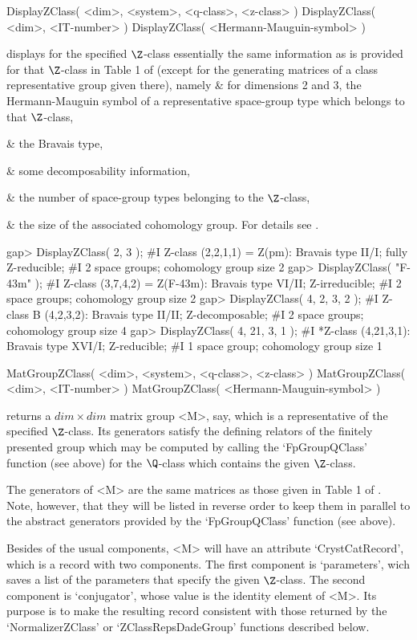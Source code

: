 \>DisplayZClass( <dim>, <system>, <q-class>, <z-class> )
\>DisplayZClass( <dim>, <IT-number> )
\>DisplayZClass( <Hermann-Mauguin-symbol> )

displays for the specified $\Z$-class essentially the same information
as is provided for that $\Z$-class in Table 1 of \cite{BBNWZ78}
(except for the generating matrices of a class representative group
given there), namely
\beginitems
& \itm for  dimensions 2 and 3, the  Hermann-Mauguin symbol of a
       representative space-group type  which belongs  to that $\Z$-class,

& \itm the Bravais type,

& \itm some decomposability information,

& \itm the number of space-group types belonging to the $\Z$-class,

& \itm the size of the associated cohomology group.
\enditems
For details see \cite{BBNWZ78}.

\beginexample
gap> DisplayZClass( 2, 3 );
#I    Z-class (2,2,1,1) = Z(pm): Bravais type II/I; fully Z-reducible;
#I     2 space groups; cohomology group size 2
gap> DisplayZClass( "F-43m" );
#I    Z-class (3,7,4,2) = Z(F-43m): Bravais type VI/II; Z-irreducible;
#I     2 space groups; cohomology group size 2
gap> DisplayZClass( 4, 2, 3, 2 );
#I    Z-class B (4,2,3,2): Bravais type II/II; Z-decomposable;
#I     2 space groups; cohomology group size 4
gap> DisplayZClass( 4, 21, 3, 1 );
#I   *Z-class (4,21,3,1): Bravais type XVI/I; Z-reducible;
#I     1 space group; cohomology group size 1
\endexample

\>MatGroupZClass( <dim>, <system>, <q-class>, <z-class> )
\>MatGroupZClass( <dim>, <IT-number> )
\>MatGroupZClass( <Hermann-Mauguin-symbol> )

returns a $dim \times dim$ matrix group <M>, say, which is a
representative of the specified $\Z$-class.  Its generators satisfy
the defining relators of the finitely presented group which may be
computed by calling the `FpGroupQClass' function (see above) for the
$\Q$-class which contains the given $\Z$-class.

The generators of <M> are the same matrices as those given  in Table 1 of
\cite{BBNWZ78}. Note, however, that they will  be listed in reverse order
to  keep them  in parallel  to  the abstract  generators provided by  the
`FpGroupQClass' function (see above).

Besides of the usual components, <M> will have an attribute
`CrystCatRecord', which is a record with two components.  The
first component is `parameters', wich saves a list of the parameters
that specify the given $\Z$-class. The second component is
`conjugator', whose value is the identity element of <M>. Its purpose
is to make the resulting record consistent with those returned by
the `NormalizerZClass' or `ZClassRepsDadeGroup' functions described
below.

